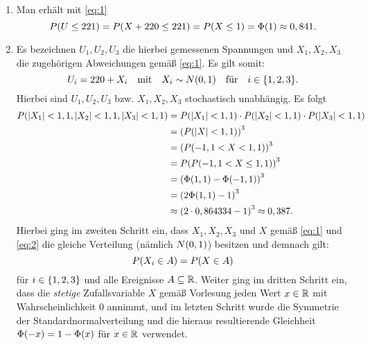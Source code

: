 \documentclass{exercise}
\begin{document}
    \begin{enumerate}
        \item Man erhält mit \eqref{eq:1}
        \[
            P\parentheses*{U \le 221} = P\parentheses*{X + 220 \le 221} = P\parentheses*{X \le 1} = \Phi\parentheses*{1} \approx 0,841.
        \]
        \item Es bezeichnen \(U_1, U_2, U_3\) die hierbei gemessenen Spannungen und \(X_1, X_2, X_3\) die zugehörigen Abweichungen gemäß \eqref{eq:1}.
        Es gilt somit:
        \begin{equation}\label{eq:2}
            U_i = 220 + X_i \quad \text{mit} \quad X_i \sim N\parentheses*{0, 1} \quad \text{für} \quad i \in \braces*{1, 2, 3}.
        \end{equation}
        Hierbei sind \(U_1, U_2, U_3\) bzw. \(X_1, X_2, X_3\) stochastisch unabhängig.
        Es folgt
        \begin{align*}
            P\parentheses*{\absolute*{X_1} < 1,1, \absolute*{X_2} < 1,1, \absolute*{X_3} < 1,1} &= P\parentheses*{\absolute*{X_1} < 1,1} \cdot P\parentheses*{\absolute*{X_2} < 1,1} \cdot P\parentheses*{\absolute*{X_3} < 1,1}\\
            &= \parentheses*{P\parentheses*{\absolute*{X} < 1,1}}^3\\
            &= \parentheses*{P\parentheses*{-1,1 < X < 1,1}}^3\\
            &= P\parentheses*{P\parentheses*{-1,1 < X \le 1,1}}^3\\
            &= \parentheses*{\Phi\parentheses*{1,1} - \Phi\parentheses*{-1,1}}^3\\
            &= \parentheses*{2\Phi\parentheses*{1,1} - 1}^3\\
            &\approx \parentheses*{2 \cdot 0,864334 - 1}^3 \approx 0,387.
        \end{align*}
        Hierbei ging im zweiten Schritt ein, dass \(X_1, X_2, X_3\) und \(X\) gemäß \eqref{eq:1} und \eqref{eq:2} die gleiche Verteilung (nämlich \(N\parentheses*{0, 1}\)) besitzen und demnach gilt:
        \[
            P\parentheses*{X_i \in A} = P\parentheses*{X \in A}
        \]
        für \(i \in \braces*{1, 2, 3}\) und alle Ereignisse \(A \subseteq \R\).
        Weiter ging im dritten Schritt ein, dass die \emph{stetige} Zufallsvariable \(X\) gemäß Vorlesung jeden Wert \(x \in \R\) mit Wahrscheinlichkeit \(0\) annimmt, und im letzten Schritt wurde die Symmetrie der Standardnormalverteilung und die hieraus resultierende Gleichheit \(\Phi\parentheses*{-x} = 1 - \Phi\parentheses*{x}\) für \(x \in \R\) verwendet.

\end{enumerate}
\end{document}
